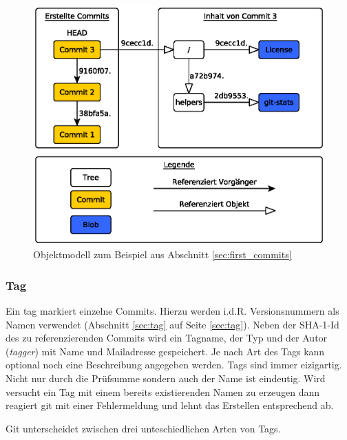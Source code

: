 \begin{figure}[hb]
  \centering
  \includegraphics[scale=0.75]{images/objectmodel.eps}
  \caption{Objektmodell zum Beispiel aus Abschnitt \ref{sec:first_commits}\cite[S.~53]{gitosp}}
  \label{fig:objectmodel}
\end{figure}

\subsubsection{Tag}\label{sec:tagobject}
Ein \gls{tag} markiert einzelne Commits. Hierzu werden i.d.R. Versionsnummern
als Namen verwendet (Abschnitt \ref{sec:tag} auf Seite \ref{sec:tag}). Neben
der \gls{SHA-1}-Id des zu referenzierenden Commits wird ein Tagname, der Typ
und der Autor (\textit{tagger}) mit Name und Mailadresse gespeichert. Je nach
Art des Tags kann optional noch eine Beschreibung angegeben werden. Tags sind
immer eizigartig. Nicht nur durch die Prüfsumme sondern auch der Name ist
eindeutig. Wird versucht ein Tag mit einem bereits existierenden Namen zu
erzeugen dann reagiert git mit einer Fehlermeldung und lehnt das Erstellen
entsprechend ab. 

Git unterscheidet zwischen drei unteschiedlichen Arten von Tags.


